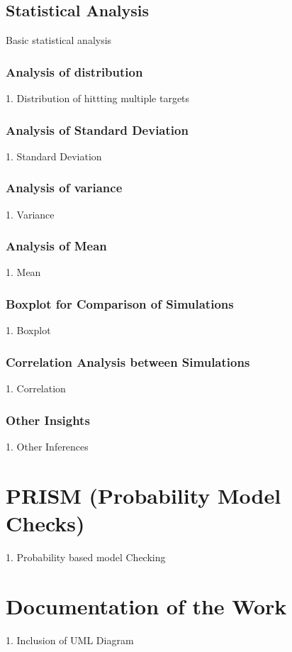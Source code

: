 \documentclass[11pt]{report}
\begin{document}
\subsection{Statistical Analysis}
Basic statistical analysis
\subsubsection*{Analysis of distribution}
1. Distribution of hittting multiple targets
\subsubsection{Analysis of Standard Deviation}
1. Standard Deviation
\subsubsection{Analysis of  variance}
1. Variance
\subsubsection{Analysis of  Mean}
1. Mean
\subsubsection{Boxplot for Comparison of Simulations}
1. Boxplot
\subsubsection{Correlation Analysis between Simulations}
1. Correlation
\subsubsection{Other Insights}
1. Other Inferences

\newpage
\section{\color{cyan} PRISM (Probability Model Checks)}
1. Probability based model Checking
\section{\color{cyan} Documentation of the Work}
1. Inclusion of UML Diagram
\end{document}
